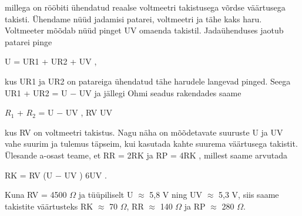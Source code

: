 millega on rööbiti ühendatud reaalse voltmeetri takistusega võrdse väärtusega takisti. Ühendame nüüd jadamisi patarei, voltmeetri ja tähe kaks haru. Voltmeeter mõõdab nüüd pinget UV omaenda takistil. Jadaühenduses jaotub patarei pinge

U = UR1 + UR2 + UV ,

kus UR1 ja UR2 on patareiga ühendatud tähe harudele langevad pinged. Seega UR1 + UR2 = U $-$ UV ja jällegi Ohmi seadus rakendades saame

$R_1$ + $R_2$ = U $-$ UV , RV UV

kus RV on voltmeetri takistus. Nagu näha on mõõdetavate suuruste U ja UV vahe suurim ja tulemus täpseim, kui kasutada kahte suurema väärtusega takistit. Ülesande a-osast teame, et RR = 2RK ja RP = 4RK , millest saame arvutada

RK = RV (U $-$ UV ) 6UV .

Kuna RV = 4500 $\Omega$ ja tüüpiliselt U $\approx$ 5,8 V ning UV $\approx$ 5,3 V, siis saame takistite väärtusteks RK $\approx$ 70 $\Omega$, RR $\approx$ 140 $\Omega$ ja RP $\approx$ 280 $\Omega$.
\probend

